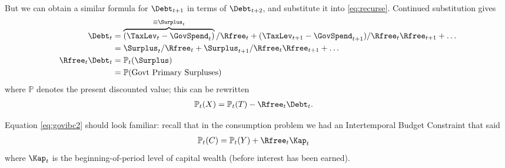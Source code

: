 \documentclass{handout}
\begin{document}
But we can obtain a similar formula for $\Debt_{t+1}$ in terms of $\Debt_{t+2}$,
and substitute it into \eqref{eq:recurse}.  Continued substitution
gives
\begin{equation}\begin{gathered}\begin{aligned}
        \Debt_{t} & =  \overbrace{(\TaxLev_{t}-\GovSpend_{t})}^{\equiv \Surplus_{t}}/\Rfree_{t}+(\TaxLev_{t+1}-\GovSpend_{t+1})/\Rfree_{t}\Rfree_{t+1}+\ldots  \\
              & =  \Surplus_{t}/\Rfree_{t}+\Surplus_{t+1}/\Rfree_{t}\Rfree_{t+1}+\ldots  \\ 
        \Rfree_{t}\Debt_{t} & =  \mathbb{P}_{t}(\Surplus)   \\
         & =  \mathbb{P}(\mbox{Govt Primary Surpluses}) \label{eq:govibc}
\end{aligned}\end{gathered}\end{equation}
where $\mathbb{P}$ denotes the present discounted value; this can be rewritten
\begin{equation}\begin{gathered}\begin{aligned}
        \mathbb{P}_{t}(X) & =  \mathbb{P}_{t}(T)-\Rfree_{t}\Debt_{t} \label{eq:govibc2}.
\end{aligned}\end{gathered}\end{equation}

Equation \eqref{eq:govibc2} should look familiar: recall that in the consumption problem we 
had an Intertemporal Budget Constraint that said  
\begin{equation}\begin{gathered}\begin{aligned}
        \mathbb{P}_{t}(C) & =  \mathbb{P}_{t}(Y)+\Rfree_{t} \Kap_{t}
\end{aligned}\end{gathered}\end{equation}
where $\Kap_{t}$ is the beginning-of-period level of capital wealth (before
interest has been earned).  
\end{document}
